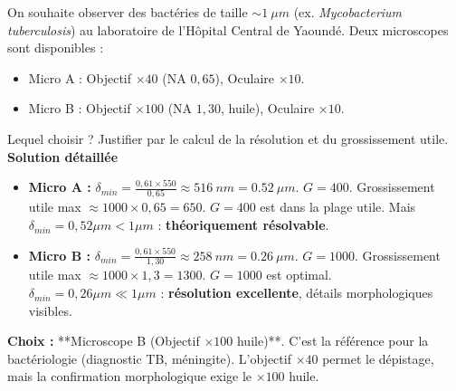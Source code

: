 \documentclass[11pt]{article}
\begin{document}
\begin{exoresolu}
On souhaite observer des bactéries de taille $\sim \SI{1}{\mu m}$ (ex. \emph{Mycobacterium tuberculosis}) au laboratoire de l'Hôpital Central de Yaoundé. Deux microscopes sont disponibles :
\begin{itemize}
    \item Micro A : Objectif $\times 40$ (NA $0,65$), Oculaire $\times 10$.
    \item Micro B : Objectif $\times 100$ (NA $1,30$, huile), Oculaire $\times 10$.
\end{itemize}
Lequel choisir ? Justifier par le calcul de la résolution et du grossissement utile.
\textbf{Solution détaillée}
\begin{itemize}
    \item \textbf{Micro A :} $\delta_{min} = \frac{0,61 \times 550}{0,65} \approx \SI{516}{nm} = \SI{0,52}{\mu m}$. $G = 400$.
        Grossissement utile max $\approx 1000 \times 0,65 = 650$. $G=400$ est dans la plage utile.
        Mais $\delta_{min} = 0,52 \mu m < 1 \mu m$ : \textbf{théoriquement résolvable}.
    \item \textbf{Micro B :} $\delta_{min} = \frac{0,61 \times 550}{1,30} \approx \SI{258}{nm} = \SI{0,26}{\mu m}$. $G = 1000$.
        Grossissement utile max $\approx 1000 \times 1,3 = 1300$. $G=1000$ est optimal.
        $\delta_{min} = 0,26 \mu m \ll 1 \mu m$ : \textbf{résolution excellente}, détails morphologiques visibles.
\end{itemize}
\textbf{Choix :} **Microscope B (Objectif $\times 100$ huile)**. C'est la référence pour la bactériologie (diagnostic TB, méningite). L'objectif $\times 40$ permet le dépistage, mais la confirmation morphologique exige le $\times 100$ huile.
\end{exoresolu}
\end{document}
